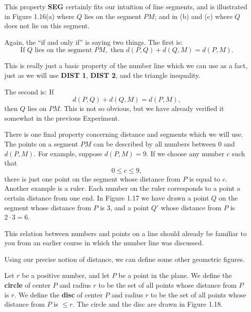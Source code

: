 \documentclass[12pt]{book} %
\begin{document}

This property \textbf{SEG} certainly fits our intuition of line segments, and is illustrated in Figure 1.16(a) where $Q$ lies on the segment $PM$; and in (b) and (c) where $Q$ does not lie on this segment.


Again, the ``if and only if'' is saying two things. The first is:
\[
\text{If } Q \text{ lies on the segment } PM,\text{ then } d(P,Q)+d(Q,M)=d(P,M).
\]

This is really just a basic property of the number line which we can use as a fact, just as we will use \textbf{DIST 1}, \textbf{DIST 2}, and the triangle inequality.

The second is: If
\[
d(P,Q)+d(Q,M)=d(P,M),
\]
then $Q$ lies on $PM$. This is not so obvious, but we have already verified it somewhat in the previous Experiment.

There is one final property concerning distance and segments which we will use. The points on a segment $PM$ can be described by all numbers between $0$ and $d(P,M)$. For example, suppose $d(P,M)=9$. If we choose any number $c$ such that
\[
0\le c\le 9,
\]
there is just one point on the segment whose distance from $P$ is equal to $c$. Another example is a ruler. Each number on the ruler corresponds to a point a certain distance from one end. In Figure 1.17 we have drawn a point $Q$ on the segment whose distance from $P$ is $3$, and a point $Q'$ whose distance from $P$ is $2\cdot 3=6$.


This relation between numbers and points on a line should already be familiar to you from an earlier course in which the number line was discussed.

Using our precise notion of distance, we can define some other geometric figures.

Let $r$ be a positive number, and let $P$ be a point in the plane. We define the \textbf{circle} of center $P$ and radius $r$ to be the set of all points whose distance from $P$ is $r$. We define the \textbf{disc} of center $P$ and radius $r$ to be the set of all points whose distance from $P$ is $\le r$. The circle and the disc are drawn in Figure 1.18.

\end{document}
